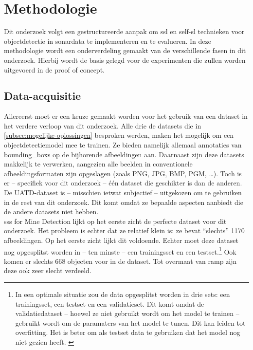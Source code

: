 
\chapter{Methodologie}%
\label{ch:methodologie}

Dit onderzoek volgt een gestructureerde aanpak om \gls{ssl} en \gls{self-sl} technieken voor objectdetectie in sonardata te implementeren en te evalueren. In deze methodologie wordt een onderverdeling gemaakt van de verschillende fasen in dit onderzoek. Hierbij wordt de basis gelegd voor de experimenten die zullen worden uitgevoerd in de proof of concept.

\section{Data-acquisitie}

Allereerst moet er een keuze gemaakt worden voor het gebruik van een dataset in het verdere verloop van dit onderzoek. Alle drie de datasets die in \ref{subsec:mogelijke-oplossingen} besproken werden, maken het mogelijk om een objectdetectiemodel mee te trainen. Ze bieden namelijk allemaal annotaties van \glspl{bounding_box} op de bijhorende afbeeldingen aan. Daarnaast zijn deze datasets makkelijk te verwerken, aangezien alle beelden in conventionele afbeeldingsformaten zijn opgeslagen (zoals PNG, JPG, BMP, PGM, \dots). Toch is er -- specifiek voor dit onderzoek -- één dataset die geschikter is dan de anderen. De UATD-dataset is -- misschien ietwat subjectief -- uitgekozen om te gebruiken in de rest van dit onderzoek. Dit komt omdat ze bepaalde aspecten aanbiedt die de andere datasets niet hebben. \\

\gls{sss} for Mine Detection lijkt op het eerste zicht de perfecte dataset voor dit onderzoek. Het probleem is echter dat ze relatief klein is: ze bevat ``slechts'' 1170 afbeeldingen. Op het eerste zicht lijkt dit voldoende. Echter moet deze dataset nog opgesplitst worden in -- ten minste -- een trainingsset en een testset.\footnote{In een optimale situatie zou de data opgesplitst worden in drie sets: een trainingsset, een testset en een validatieset. Dit komt omdat de validatiedataset -- hoewel ze niet gebruikt wordt om het model te trainen -- gebruikt wordt om de paramaters van het model te tunen. Dit kan leiden tot \gls{overfitting}. Het is beter om als testset data te gebruiken dat het model nog niet gezien heeft. \autocite{Goodfellow_2016}} Ook komen er slechts 668 objecten voor in de dataset. Tot overmaat van ramp zijn deze ook zeer slecht verdeeld. 

